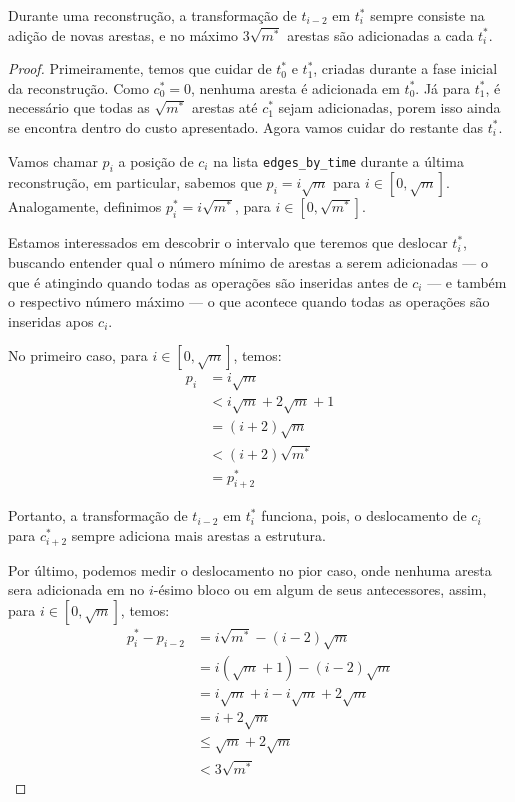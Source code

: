 \begin{theorem}
    \label{teo:deslocamento}
    Durante uma reconstrução, a transformação de $t_{i-2}$ em $t_i^*$ sempre consiste na adição de novas arestas, e no máximo $3 \sqrt{m^*}$ arestas são adicionadas a cada $t_i^*$.
\end{theorem}
\begin{proof}
    Primeiramente, temos que cuidar de $t_0^*$ e $t_1^*$, criadas durante a fase inicial da reconstrução. Como $c_0^* = 0$, nenhuma aresta é adicionada em $t_0^*$. Já para $t_1^*$, é necessário que todas as $\sqrt{m^*}$ arestas até $c_1^*$ sejam adicionadas, porem isso ainda se encontra dentro do custo apresentado. Agora vamos cuidar do restante das $t_i^*$.

    Vamos chamar $p_i$ a posição de $c_i$ na lista \texttt{edges\_by\_time} durante a última reconstrução, em particular, sabemos que $p_i = i \sqrt{m}$ para $i \in [0, \sqrt{m}]$. Analogamente, definimos $p_i^* = i\sqrt{m^*}$, para $i \in [0, \sqrt{m^*}]$.

    Estamos interessados em descobrir o intervalo que teremos que deslocar $t_i^*$, buscando entender qual o número mínimo de arestas a serem adicionadas --- o que é atingindo quando todas as operações são inseridas antes de $c_i$ --- e também o respectivo número máximo --- o que acontece quando todas as operações são inseridas apos $c_i$.

    No primeiro caso, para $i \in [0, \sqrt{m}]$, temos:
    \begin{align*}
        p_i & = i \sqrt{m}                 \\
            & < i \sqrt{m} + 2\sqrt{m} + 1 \\
            & = (i+2) \sqrt{m}             \\
            & < (i+2) \sqrt{m^*}           \\
            & = p_{i+2}^*
    \end{align*}

    Portanto, a transformação de $t_{i-2}$ em $t_i^*$ funciona, pois, o deslocamento de $c_i$ para $c_{i+2}^*$ sempre adiciona mais arestas a estrutura.

    Por último, podemos medir o deslocamento no pior caso, onde nenhuma aresta sera adicionada em no $i$-ésimo bloco ou em algum de seus antecessores, assim, para $i \in [0, \sqrt{m}]$, temos:
    \begin{align*}
        p_i^* - p_{i-2} & = i\sqrt{m^*} - (i-2)\sqrt{m}           \\
                        & = i(\sqrt{m}+1) - (i-2)\sqrt{m}         \\
                        & = i\sqrt{m} + i - i\sqrt{m} + 2\sqrt{m} \\
                        & = i + 2\sqrt{m}                         \\
                        & \leq \sqrt{m} + 2\sqrt{m}               \\
                        & < 3\sqrt{m^*}
    \end{align*}
\end{proof}

